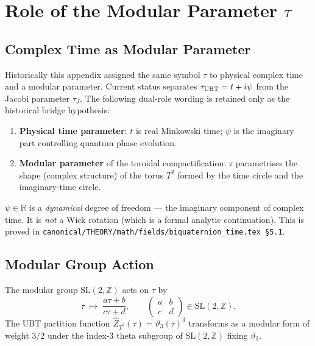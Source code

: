 \documentclass[11pt,a4paper]{article}
\theoremstyle{definition}
\theoremstyle{remark}
\begin{document}
\section{Role of the Modular Parameter $\tau$}\label{sec:modular}

\subsection{Complex Time as Modular Parameter}

Historically this appendix assigned the same symbol $\tau$ to physical complex time and a modular parameter. Current status separates $\tau_{\rm UBT}=t+i\psi$ from the Jacobi parameter $\tau_J$. The following dual-role wording is retained only as the historical bridge hypothesis:
\begin{enumerate}
  \item \textbf{Physical time parameter}: $t$ is real Minkowski time; $\psi$
    is the imaginary part controlling quantum phase evolution.
  \item \textbf{Modular parameter} of the toroidal compactification: $\tau$
    parametrises the shape (complex structure) of the torus $T^2$ formed
    by the time circle and the imaginary-time circle.
\end{enumerate}

\begin{tcolorbox}[colback=yellow!5!white,colframe=orange!60!black,title=Important: $\psi$ is NOT Wick rotation]
$\psi \in \mathbb{R}$ is a \emph{dynamical} degree of freedom — the imaginary
component of complex time.  It is \emph{not} a Wick rotation (which is a formal
analytic continuation).  This is proved in
\texttt{canonical/THEORY/math/fields/biquaternion\_time.tex \S5.1}.
\end{tcolorbox}

\subsection{Modular Group Action}

The modular group $\mathrm{SL}(2,\mathbb{Z})$ acts on $\tau$ by
\begin{equation}
  \tau \;\mapsto\; \frac{a\tau + b}{c\tau + d},
  \qquad
  \begin{pmatrix}a&b\\c&d\end{pmatrix} \in \mathrm{SL}(2,\mathbb{Z}).
\end{equation}
The UBT partition function $\hat{Z}_{T^3}(\tau) = \vartheta_3(\tau)^3$ transforms
as a modular form of weight $3/2$ under the index-3 theta subgroup of
$\mathrm{SL}(2,\mathbb{Z})$ fixing $\vartheta_3$.
\end{document}
